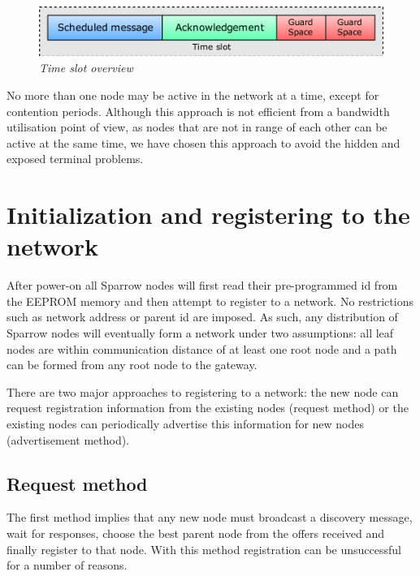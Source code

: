 \begin{figure}[ht]
	\begin{center}
		\includegraphics[width=\textwidth]{img/time_slot.pdf}
	\end{center}
	\caption{\small \itshape{Time slot overview}}
\end{figure}

No more than one node may be active in the network at a time, except for
contention periods. Although this approach is not efficient from a bandwidth
utilisation point of view, as nodes that are not in range of each other can be
active at the same time, we have chosen this approach to avoid the hidden and
exposed terminal problems\cite{jayasuriya2004hidden}. 

\section{Initialization and registering to the network}
\label{sec:initialization_and_registering_into_the_network}

After power-on all Sparrow nodes will first read their pre-programmed id from
the \mbox{EEPROM} memory and then attempt to register to a network. No
restrictions such as network address or parent id are imposed. As such, any
distribution of Sparrow nodes will eventually form a network under two
assumptions: all leaf nodes are within communication distance of at least one
root node and a path can be formed from any root node to the gateway.

There are two major approaches to registering to a network: the new node can
request registration information from the existing nodes (request method) or
the existing nodes can periodically advertise this information for new nodes
(advertisement method). 

\subsection{Request method}

The first method implies that any new node must broadcast a discovery message,
wait for responses, choose the best parent node from the offers received and
finally register to that node. With this method registration can be
unsuccessful for a number of reasons.

